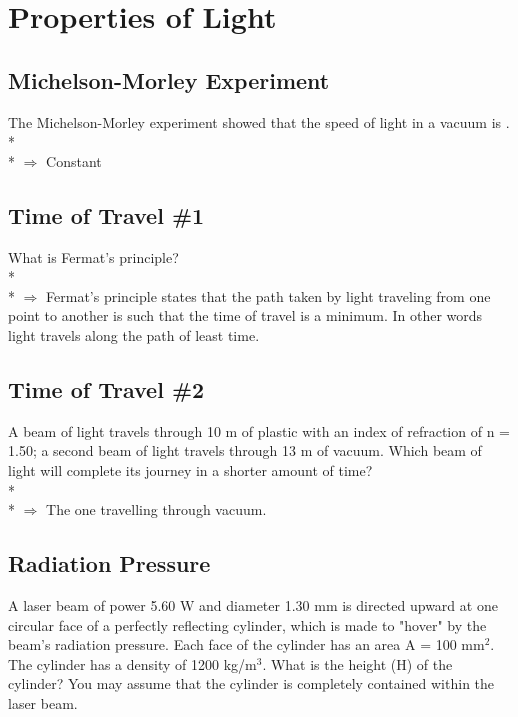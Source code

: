 \documentclass[11pt]{article}
\begin{document}

\pagebreak
\section{Properties of Light}
\vspace{10pt}

\subsection{Michelson-Morley Experiment}
The Michelson-Morley experiment showed that the speed of light in a vacuum is \underline{\hspace{8mm}}. \\* \\*
$\Rightarrow$ Constant

\subsection{Time of Travel \#1}
What is Fermat's principle? \\* \\*
$\Rightarrow$ Fermat's principle states that the path taken by light traveling from one point to another is such that the time of travel is a minimum.  In other words light travels along the path of least time.

\subsection{Time of Travel \#2}
A beam of light travels through 10 m of plastic with an index of refraction of n = 1.50; a second beam of light travels through 13 m of vacuum.  Which beam of light will complete its journey in a shorter amount of time? \\* \\*
$\Rightarrow$ The one travelling through vacuum.

\subsection{Radiation Pressure}
A laser beam of power 5.60 W and diameter 1.30 mm is directed upward at one circular face of a perfectly reflecting cylinder, which is made to "hover" by the beam's radiation pressure.  Each face of the cylinder has an area A = 100 mm$^2$.  The cylinder has a density of 1200 kg/m$^3$.  What is the height (H) of the cylinder?  You may assume that the cylinder is completely contained within the laser beam.
\end{document}
